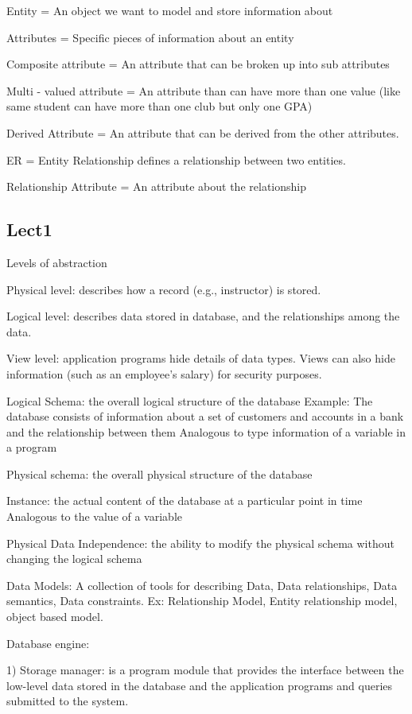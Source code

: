 \documentclass[8pt, a4paper, oneside, twocolumn]{extarticle}
\begin{document}
Entity = An object we want to model and store information about

Attributes = Specific pieces of information about an entity

Composite attribute = An attribute that can be broken up into sub attributes

Multi - valued attribute = An attribute than can have more than one value (like same student can have more than one club but only one GPA)

Derived Attribute = An attribute that can be derived from the other attributes.

ER = Entity Relationship defines a relationship between two entities.

Relationship Attribute = An attribute about the relationship

\subsection{Lect1}
Levels of abstraction

Physical level: describes how a record (e.g., instructor) is stored.

Logical level: describes data stored in database, and the relationships among 
the data.

View level: application programs hide details of data types.  Views can also 
hide information (such as an employee’s salary) for security purposes. 

Logical Schema: the overall logical structure of the database 
Example: The database consists of information about a set of customers and 
accounts in a bank and the relationship between them
Analogous to type information of a variable in a program

Physical schema: the overall physical structure of the database 

Instance: the actual content of the database at a particular point in time 
Analogous to the value of a variable

Physical Data Independence: the ability to modify the physical schema without 
changing the logical schema

Data Models: A collection of tools for describing Data, Data relationships, Data semantics, Data constraints. Ex: Relationship Model, Entity relationship model, object based model.

Database engine: 

1) Storage manager: is a program module that provides the interface between 
the low-level data stored in the database and the application programs and 
queries submitted to the system.
\end{document}
